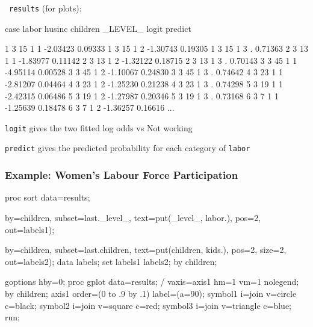 \begin{frame}[fragile]
\ODS\ \texttt{results} (for plots):
\begin{Output}[baselinestretch=0.7,gobble=2]
  case   labor   husinc  children   _LEVEL_     logit    predict

    1      3       15        1         1      -2.03423   0.09333
    1      3       15        1         2      -1.30743   0.19305
    1      3       15        1         3        .        0.71363
    2      3       13        1         1      -1.83977   0.11142
    2      3       13        1         2      -1.32122   0.18715
    2      3       13        1         3        .        0.70143
    3      3       45        1         1      -4.95114   0.00528
    3      3       45        1         2      -1.10067   0.24830
    3      3       45        1         3        .        0.74642
    4      3       23        1         1      -2.81207   0.04464
    4      3       23        1         2      -1.25230   0.21238
    4      3       23        1         3        .        0.74298
    5      3       19        1         1      -2.42315   0.06486
    5      3       19        1         2      -1.27987   0.20346
    5      3       19        1         3        .        0.73168
    6      3        7        1         1      -1.25639   0.18478
    6      3        7        1         2      -1.36257   0.16616
    ...
\end{Output}
\begin{itemize*}
	\item \texttt{logit} gives the two fitted log odds vs Not working
	\item \texttt{predict} gives the predicted probability for each category of \texttt{labor}
\end{itemize*}
\end{frame}

\begin{frame}[fragile]
  \frametitle{Example: Women's Labour Force Participation}
\begin{Input}[label=\fbox{$\cdots$ \texttt{wlfpart5.sas}},baselinestretch=0.7]
proc sort data=results;

   by=children, subset=last._level_, text=put(_level_, labor.), 
   pos=2, out=labels1);

   by=children, subset=last.children, text=put(children, kids.), 
   pos=2, size=2, out=labels2);
data labels;
   set labels1 labels2;
   by children;

goptions hby=0;
proc gplot data=results;
    / 
      vaxis=axis1 hm=1 vm=1  nolegend;
   by children;
   axis1 order=(0 to .9 by .1) label=(a=90);
   symbol1 i=join v=circle   c=black;
   symbol2 i=join v=square   c=red;
   symbol3 i=join v=triangle c=blue;
   run;
\end{Input}
\end{frame}

